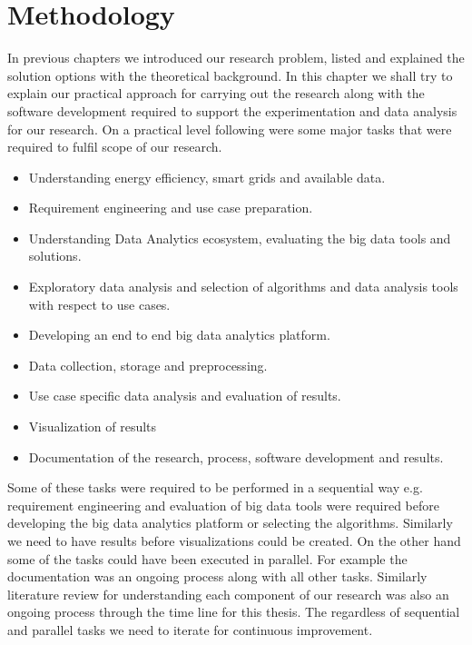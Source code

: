 \chapter{Methodology}\label{method}
\label{Methodology}
In previous chapters we introduced our research problem, listed and explained the solution options with the theoretical background. In this chapter we shall try to explain our practical approach for carrying out the research along with the software development required to support the experimentation and data analysis for our research. On a practical level following were some major tasks that were required to fulfil scope of our research.
\begin{itemize}
\item Understanding energy efficiency, smart grids and available data.
\item Requirement engineering and use case preparation.
\item Understanding Data Analytics ecosystem, evaluating the big data tools and solutions.
\item Exploratory data analysis and selection of algorithms and data analysis tools with respect to use cases. 
\item Developing an end to end big data analytics platform.
\item Data collection, storage and preprocessing.
\item Use case specific data analysis and evaluation of results.
\item Visualization of results 
\item Documentation of the research, process, software development and results.
\end{itemize}
Some of these tasks were required to be performed in a sequential way e.g. requirement engineering and evaluation of big data tools were required before developing the big data analytics platform or selecting the algorithms. Similarly we need to have results before visualizations could be created. On the other hand some of the tasks could have been executed in parallel. For example the documentation was an ongoing process along with all other tasks. Similarly literature review for understanding each component of our research was also an ongoing process through the time line for this thesis. The regardless of sequential and parallel tasks we need to iterate for continuous improvement.

